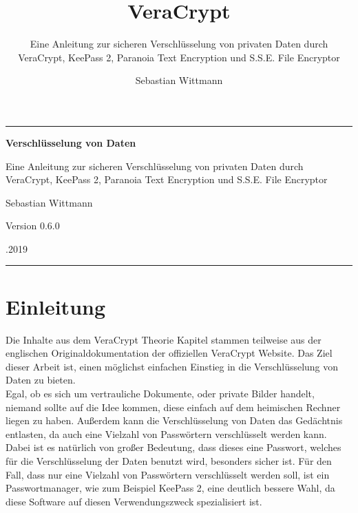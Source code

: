 \documentclass[12pt,a4paper]{scrreprt}
\author{Sebastian Wittmann}
\title{VeraCrypt}
\subtitle{Eine Anleitung zur sicheren Verschlüsselung von privaten Daten durch VeraCrypt, KeePass 2, Paranoia Text Encryption und S.S.E. File Encryptor}
\begin{document}
\begin{titlepage}
\begin{center}
\noindent\rule{470pt}{0.4pt}\par
\vspace{6cm}
{\fontsize{29.86pt}{29.86pt}\selectfont \textbf{Verschlüsselung von Daten}} \par
\vspace{0.5cm}
{\fontsize{17.28pt}{17.28pt}\selectfont Eine Anleitung zur sicheren Verschlüsselung von privaten Daten durch VeraCrypt, KeePass 2, Paranoia Text Encryption und S.S.E. File Encryptor}\par
\vspace{3cm}
{\fontsize{20.74pt}{20.74pt}\selectfont Sebastian Wittmann} \par
\vspace{2cm}
{\fontsize{14pt}{14pt}\selectfont Version 0.6.0}\par
\vspace{9cm}
{\fontsize{14pt}{14pt}.2019}
\noindent\rule{470pt}{0.4pt}
\end{center}
\end{titlepage}
\tableofcontents

\chapter{Einleitung}
Die Inhalte aus dem VeraCrypt Theorie Kapitel stammen teilweise aus der englischen Originaldokumentation der offiziellen VeraCrypt Website. Das Ziel dieser Arbeit ist, einen möglichst einfachen Einstieg in die Verschlüsselung von Daten zu bieten.\\

\noindent Egal, ob es sich um vertrauliche Dokumente, oder private Bilder handelt, niemand sollte auf die Idee kommen, diese einfach auf dem heimischen Rechner liegen zu haben. Außerdem kann die Verschlüsselung von Daten das Gedächtnis entlasten, da auch eine Vielzahl von Passwörtern verschlüsselt werden kann. Dabei ist es natürlich von großer Bedeutung, dass dieses eine Passwort, welches für die Verschlüsselung der Daten benutzt wird, besonders sicher ist. Für den Fall, dass nur eine Vielzahl von Passwörtern verschlüsselt werden soll, ist ein Passwortmanager, wie zum Beispiel KeePass 2, eine deutlich bessere Wahl, da diese Software auf diesen Verwendungszweck spezialisiert ist.\\
\end{document}
